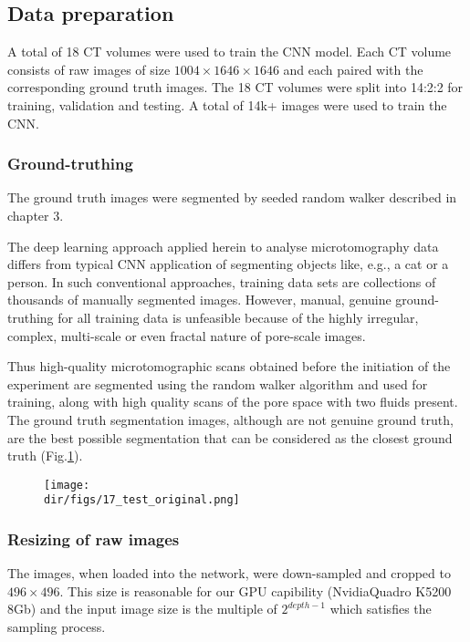 \subsection{Data preparation}
A total of 18 CT volumes were used to train the CNN model. Each CT volume consists of raw images of size $1004 \times 1646 \times 1646$ and each paired with the corresponding ground truth images. The 18 CT volumes were split into 14:2:2 for training, validation and testing. A total of 14k+ images were used to train the CNN.

\subsubsection{Ground-truthing}
The ground truth images were segmented by seeded random walker described in chapter 3. 

The deep learning approach applied herein to analyse microtomography data differs from typical CNN application of segmenting objects like, e.g., a cat or a person. In such conventional approaches, training data sets are collections of thousands of manually segmented images. However, manual, genuine ground-truthing for all training data is unfeasible because of the highly irregular, complex, multi-scale or even fractal nature of pore-scale images. 

Thus high-quality microtomographic scans obtained before the initiation of the experiment are segmented using the random walker algorithm and used for training, along with high quality scans of the pore space with two fluids present. The ground truth segmentation images, although are not genuine ground truth, are the best possible segmentation that can be considered as the closest ground truth (Fig.\ref{test_original}). 

\begin{figure}[htbp]
  \centering
  \texttt{[image: \\dir/figs/17\_test\_original.png]}
  \caption{}
  \label{test_original}
\end{figure}

\subsubsection{Resizing of raw images}
The images, when loaded into the network, were down-sampled and cropped to $496\times496$. This size is reasonable for our GPU capibility (Nvidia\texttrademark Quadro K5200 8Gb) and the input image size is the multiple of $2^{depth-1}$
which satisfies the sampling process. 

